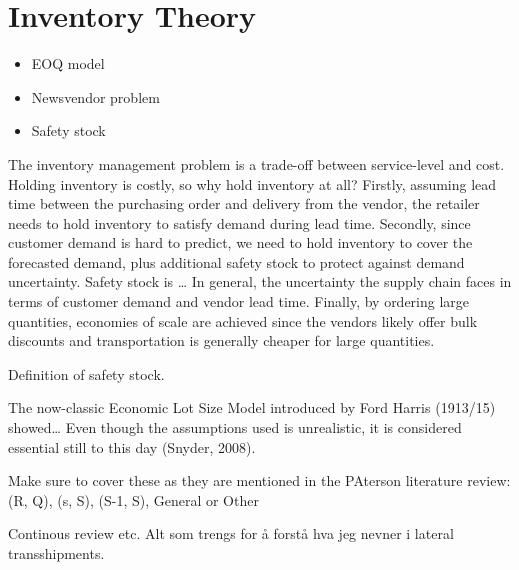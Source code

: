 \documentclass[../../main.tex]{subfiles}
\begin{document}

\section{Inventory Theory}

\begin{itemize}
\item EOQ model
\item Newsvendor problem
\item Safety stock
\end{itemize}


The inventory management problem is a trade-off between service-level and cost. Holding inventory is costly, so why hold inventory at all? Firstly, assuming lead time between the purchasing order and delivery from the vendor, the retailer needs to hold inventory to satisfy demand during lead time. Secondly, since customer demand is hard to predict, we need to hold inventory to cover the forecasted demand, plus additional safety stock to protect against demand uncertainty. Safety stock is … In general, the uncertainty the supply chain faces in terms of customer demand and vendor lead time. Finally, by ordering large quantities, economies of scale are achieved since the vendors likely offer bulk discounts and transportation is generally cheaper for large quantities. 

Definition of safety stock.

The now-classic Economic Lot Size Model introduced by Ford Harris (1913/15) showed… Even though the assumptions used is unrealistic, it is considered essential still to this day (Snyder, 2008).

Make sure to cover these as they are mentioned in the PAterson literature review: (R, Q), (s, S), (S-1, S), General or Other

Continous review etc. Alt som trengs for å forstå hva jeg nevner i lateral transshipments.

\end{document}
